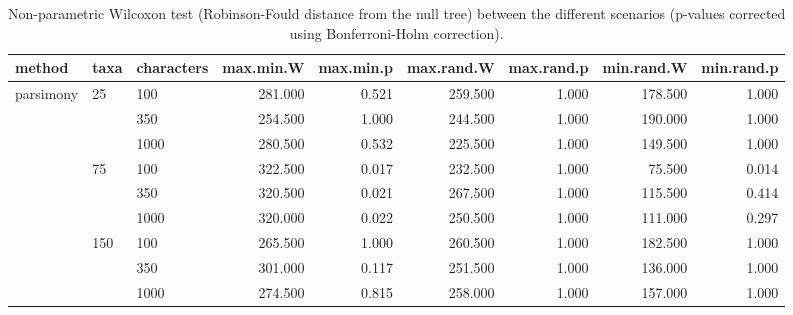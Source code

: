 \begin{table}[ht]
\centering
\begin{tabular}{lllrrrrrr}
  \hline
method & taxa & characters & max.min.W & max.min.p & max.rand.W & max.rand.p & min.rand.W & min.rand.p \\ 
  \hline
parsimony & 25 & 100 & 281.000 & 0.521 & 259.500 & 1.000 & 178.500 & 1.000 \\ 
   &  & 350 & 254.500 & 1.000 & 244.500 & 1.000 & 190.000 & 1.000 \\ 
   &  & 1000 & 280.500 & 0.532 & 225.500 & 1.000 & 149.500 & 1.000 \\ 
   & 75 & 100 & 322.500 & 0.017 & 232.500 & 1.000 & 75.500 & 0.014 \\ 
   &  & 350 & 320.500 & 0.021 & 267.500 & 1.000 & 115.500 & 0.414 \\ 
   &  & 1000 & 320.000 & 0.022 & 250.500 & 1.000 & 111.000 & 0.297 \\ 
   & 150 & 100 & 265.500 & 1.000 & 260.500 & 1.000 & 182.500 & 1.000 \\ 
   &  & 350 & 301.000 & 0.117 & 251.500 & 1.000 & 136.000 & 1.000 \\ 
   &  & 1000 & 274.500 & 0.815 & 258.000 & 1.000 & 157.000 & 1.000 \\ 
   \hline
\end{tabular}
\caption{Non-parametric Wilcoxon test (Robinson-Fould distance from the null tree) between the different scenarios (p-values corrected using Bonferroni-Holm correction).} 
\label{Full_Tab_Parsimony_WXRFnull}
\end{table}
